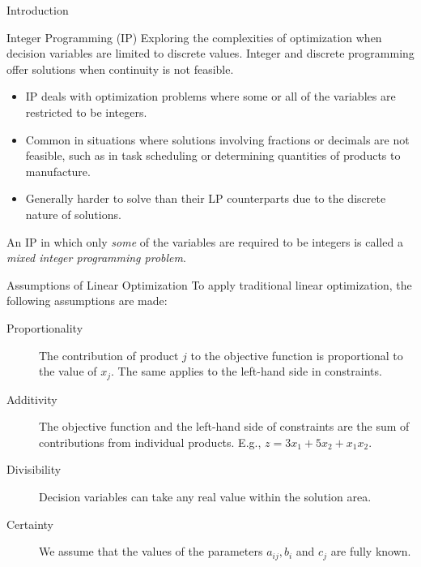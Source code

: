 \documentclass[
    NAME={Dr. Helga Ingimundardóttir},
    EMAIL={helgaingim@hi.is},
    FACULTY={Industrial Engineering},
    TITLE={Mixed Integer Programming},
    SUBTITLE={Techniques and Applications},
    SEMINAR={VÉL113F},
    DATE={Design and Optimization},
    WIDE=true
]{../HI-latex/hi-beamer}
\begin{document}
    \begin{frame}{Introduction}
        \begin{block}{Integer Programming (IP)}
            Exploring the complexities of optimization when decision variables are limited to discrete values. Integer and
            discrete programming offer solutions when continuity is not feasible.

            \small
            \begin{itemize}
                \item IP deals with optimization problems where some or all of the variables are restricted to be integers.
                \item Common in situations where solutions involving fractions or decimals are not feasible, such as
                in task scheduling or determining quantities of products to manufacture.
                \item Generally harder to solve than their LP counterparts due to the discrete nature of solutions.
            \end{itemize}
        \end{block}

        An IP in which only \emph{some} of the variables are required to be integers is called a \emph{mixed integer
        programming problem}.


    \end{frame}

    \begin{frame}{Assumptions of Linear Optimization}
        To apply traditional linear optimization, the following assumptions are made:
        \begin{description}
            \item[Proportionality] The contribution of product $j$ to the objective function is proportional to
            the value of $x_j$. The same applies to the left-hand side in constraints.
            \item[Additivity] The objective function and the left-hand side of constraints are the sum of
            contributions from individual products. E.g., $ z = 3x_1 + 5x_2 + x_1x_2 $.
            \item[Divisibility] Decision variables can take any real value within the solution area.
            \item[Certainty] We assume that the values of the parameters $ a_{ij}, b_i $ and $ c_j $ are fully
            known.
        \end{description}
    \end{frame}
\end{document}
